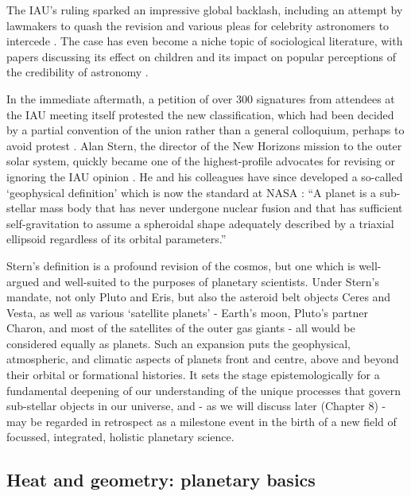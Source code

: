 \documentclass[a4paper,11pt,oneside]{book}
\begin{document}
The IAU's ruling sparked an impressive global backlash, including an attempt by lawmakers to quash the revision \cite{Zielinski2007-fv} and various pleas for celebrity astronomers to intercede \cite{Tyson2009-oe}. The case has even become a niche topic of sociological literature, with papers discussing its effect on children \citet{Jarman2009-ms, Broughton2013-wz} and its impact on popular perceptions of the credibility of astronomy \citet{Christensen2007-xw, Messeri2010-wo}.

In the immediate aftermath, a petition of over 300 signatures from attendees at the IAU meeting itself protested the new classification, which had been decided by a partial convention of the union rather than a general colloquium, perhaps to avoid protest \cite{Cartlidge2006-oe}. Alan Stern, the director of the New Horizons mission to the outer solar system, quickly became one of the highest-profile advocates for revising or ignoring the IAU opinion \cite{Hogan2006-aw}. He and his colleagues have since developed a so-called `geophysical definition' which is now the standard at NASA \cite{Runyon2017-rz}: ``A planet is a sub-stellar mass body that has never undergone nuclear fusion and that has sufficient self-gravitation to assume a spheroidal shape adequately described by a triaxial ellipsoid regardless of its orbital parameters.''

Stern's definition is a profound revision of the cosmos, but one which is well-argued and well-suited to the purposes of planetary scientists. Under Stern's mandate, not only Pluto and Eris, but also the asteroid belt objects Ceres and Vesta, as well as various `satellite planets' - Earth's moon, Pluto's partner Charon, and most of the satellites of the outer gas giants - all would be considered equally as planets. Such an expansion puts the geophysical, atmospheric, and climatic aspects of planets front and centre, above and beyond their orbital or formational histories. It sets the stage epistemologically for a fundamental deepening of our understanding of the unique processes that govern sub-stellar objects in our universe, and - as we will discuss later (Chapter 8) - may be regarded in retrospect as a milestone event in the birth of a new field of focussed, integrated, holistic planetary science.

\subsection{Heat and geometry: planetary basics}
\end{document}
